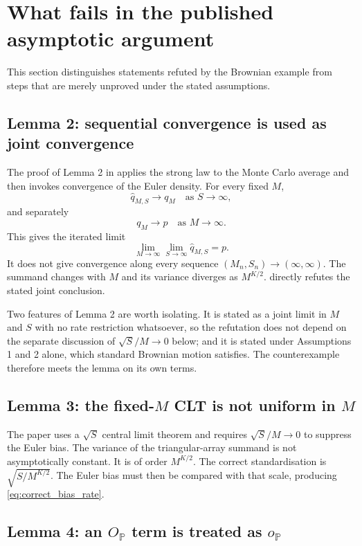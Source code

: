\documentclass[11pt]{article}
\theoremstyle{definition}
\newcommand{\Pp}{\mathbb{P}}
\begin{document}
\section{What fails in the published asymptotic argument}\label{sec:proof_review}

This section distinguishes statements refuted by the Brownian example from steps that are merely unproved under the stated assumptions.

\subsection{Lemma 2: sequential convergence is used as joint convergence}

The proof of Lemma 2 in \citet{BrandtSantaClara2002} applies the strong law to the Monte Carlo average and then invokes convergence of the Euler density. For every fixed $M$,
\[
\widehat q_{M,S}\to q_M\quad\text{as }S\to\infty,
\]
and separately
\[
q_M\to p\quad\text{as }M\to\infty.
\]
This gives the iterated limit
\[
\lim_{M\to\infty}\lim_{S\to\infty}\widehat q_{M,S}=p.
\]
It does not give convergence along every sequence $(M_n,S_n)\to(\infty,\infty)$. The summand changes with $M$ and its variance diverges as $M^{K/2}$.  directly refutes the stated joint conclusion.

Two features of Lemma 2 are worth isolating. It is stated as a joint limit in $M$ and $S$ with no rate restriction whatsoever, so the refutation does not depend on the separate discussion of $\sqrt S/M\to0$ below; and it is stated under Assumptions 1 and 2 alone, which standard Brownian motion satisfies. The counterexample therefore meets the lemma on its own terms.

\subsection{Lemma 3: the fixed-$M$ CLT is not uniform in $M$}

The paper uses a $\sqrt S$ central limit theorem and requires $\sqrt S/M\to0$ to suppress the Euler bias. The variance of the triangular-array summand is not asymptotically constant. It is of order $M^{K/2}$. The correct standardisation is $\sqrt{S/M^{K/2}}$. The Euler bias must then be compared with that scale, producing \eqref{eq:correct_bias_rate}.

\subsection{Lemma 4: an $O_{\Pp}$ term is treated as $o_{\Pp}$}
\end{document}
